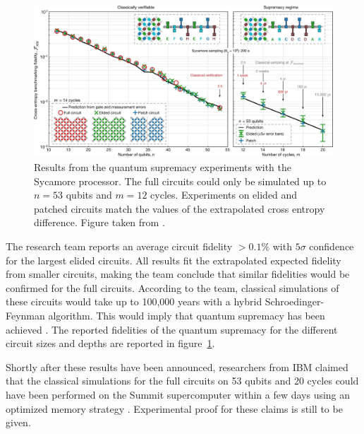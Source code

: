 \begin{figure}[H]
  \centering
  \includegraphics[width=\textwidth]{figures/supremacy_results}
  \caption[Cross Entropy Fidelity of the Sycamore Processor]{Results from the quantum supremacy experiments 
  with the Sycamore processor. The full circuits could only be simulated up to $n=53$ qubits and 
  $m=12$ cycles. Experiments on elided and patched circuits match the values of the extrapolated cross entropy difference.
  Figure taken from \cite{martines2019supremacy}.}
  \label{fig:supremacy_results}
\end{figure}

The research team reports an average circuit fidelity $ > 0.1\%$ with $5\sigma$ confidence
for the largest elided circuits. All results fit the extrapolated expected
fidelity from smaller circuits, making the team conclude that similar fidelities
would be confirmed for the full circuits. According to the team, classical simulations of these
circuits would take up to 100,000 years with a hybrid
Schroedinger-Feynman algorithm. This would imply
that quantum supremacy has been achieved \cite{martines2019supremacy}. The reported fidelities of the quantum supremacy for
the different circuit sizes and depths are reported in figure~\ref{fig:supremacy_results}.

Shortly after these results have been announced, researchers from IBM claimed that the classical simulations
for the full circuits on 53 qubits and 20 cycles could have been performed
on the Summit supercomputer within a few days using an optimized memory
strategy \cite{pednault2019leveraging}. Experimental proof for these claims is still to be given.

